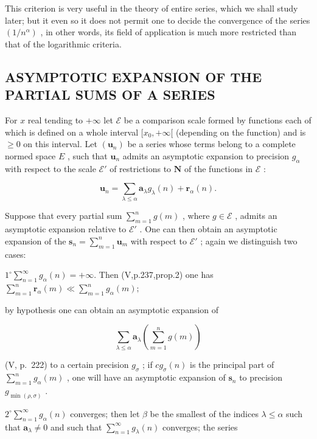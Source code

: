 This criterion is very useful in the theory of entire series, which we shall study later; but it even so it does not permit one to decide the convergence of the series \((1/n^{\alpha})\) , in other words, its field of application is much more restricted than that of the logarithmic criteria.

\subsection{ASYMPTOTIC EXPANSION OF THE PARTIAL SUMS OF A SERIES}

For \(x\) real tending to \(+\infty\) let \(\mathcal{E}\) be a comparison scale formed by functions each of which is defined on a whole interval \([x_0, +\infty[\) (depending on the function) and is \(\geqslant 0\) on this interval. Let \((\mathbf{u}_n)\) be a series whose terms belong to a complete normed space \(E\) , such that \(\mathbf{u}_n\) admits an asymptotic expansion to precision \(g_\alpha\) with respect to the scale \(\mathcal{E}'\) of restrictions to \(\mathbf{N}\) of the functions in \(\mathcal{E}\) :

\[
\mathbf {u} _ {n} = \sum_ {\lambda \leqslant \alpha} \mathbf {a} _ {\lambda} g _ {\lambda} (n) + \mathbf {r} _ {\alpha} (n).
\]

Suppose that every partial sum \(\sum_{m=1}^{n} g(m)\) , where \(g \in \mathcal{E}\) , admits an asymptotic expansion relative to \(\mathcal{E}'\) . One can then obtain an asymptotic expansion of the \(\mathbf{s}_n = \sum_{m=1}^{n} \mathbf{u}_m\) with respect to \(\mathcal{E}'\) ; again we distinguish two cases:

\(1^{\circ}\sum_{n = 1}^{\infty}g_{\alpha}(n) = +\infty .\) Then (V,p.237,prop.2) one has \(\sum_{m = 1}^{n}\mathbf{r}_{\alpha}(m)\ll \sum_{m = 1}^{n}g_{\alpha}(m);\)

by hypothesis one can obtain an asymptotic expansion of

\[
\sum_ {\lambda \leqslant \alpha} \mathbf {a} _ {\lambda} \left(\sum_ {m = 1} ^ {n} g (m)\right)
\]

(V, p.~222) to a certain precision \(g_{\sigma}\) ; if \(cg_{\sigma}(n)\) is the principal part of \(\sum_{m=1}^{n} g_{\alpha}(m)\) , one will have an asymptotic expansion of \(\mathbf{s}_n\) to precision \(g_{\min(\rho, \sigma)}\) .

\(2^{\circ}\sum_{n = 1}^{\infty}g_{\alpha}(n)\) converges; then let \(\beta\) be the smallest of the indices \(\lambda \leqslant \alpha\) such that \(\mathbf{a}_{\lambda}\neq 0\) and such that \(\sum_{n = 1}^{\infty}g_{\lambda}(n)\) converges; the series

